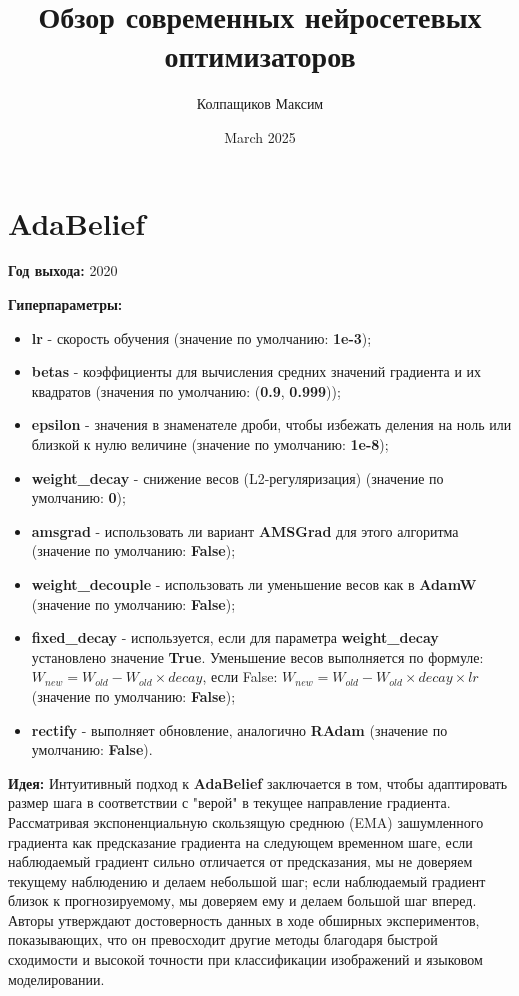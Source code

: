 \documentclass{article}
\title{Обзор современных нейросетевых оптимизаторов}
\author{Колпащиков Максим}
\date{March 2025}
\begin{document}
\maketitle

\section{\textbf{AdaBelief}}

\textbf{Год выхода:} 2020

\textbf{Гиперпараметры:}

\begin{itemize}
    \item \textbf{lr} - скорость обучения (значение по умолчанию: \textbf{1e-3});
    \item \textbf{betas} - коэффициенты для вычисления средних значений градиента и их квадратов (значения по умолчанию: (\textbf{0.9}, \textbf{0.999}));
    \item \textbf{epsilon} - значения в знаменателе дроби, чтобы избежать деления на ноль или близкой к нулю величине (значение по умолчанию: \textbf{1e-8});
    \item \textbf{weight\_decay} - снижение весов (L2-регуляризация) (значение по умолчанию: \textbf{0});
    \item \textbf{amsgrad} - использовать ли вариант \textbf{AMSGrad} для этого алгоритма (значение по умолчанию: \textbf{False});
    \item \textbf{weight\_decouple} - использовать ли уменьшение весов как в \textbf{AdamW} (значение по умолчанию: \textbf{False});
    \item \textbf{fixed\_decay} - используется, если для параметра \textbf{weight\_decay} установлено значение \textbf{True}. Уменьшение весов выполняется по формуле: $W_{new} = W_{old} - W_{old} \times decay$, если False: $W_{new} = W_{old} - W_{old} \times decay \times lr$ (значение по умолчанию: \textbf{False});
    \item \textbf{rectify} - выполняет обновление, аналогично \textbf{RAdam} (значение по умолчанию: \textbf{False}).
\end{itemize}

\textbf{Идея:} Интуитивный подход к \textbf{AdaBelief} заключается в том, чтобы адаптировать размер шага в соответствии с "верой" в текущее направление градиента. Рассматривая экспоненциальную скользящую среднюю (EMA) зашумленного градиента как предсказание градиента на следующем временном шаге, если наблюдаемый градиент сильно отличается от предсказания, мы не доверяем текущему наблюдению и делаем небольшой шаг; если наблюдаемый градиент близок к прогнозируемому, мы доверяем ему и делаем большой шаг вперед. Авторы утверждают достоверность данных в ходе обширных экспериментов, показывающих, что он превосходит другие методы благодаря быстрой сходимости и высокой точности при классификации изображений и языковом моделировании.
\end{document}
